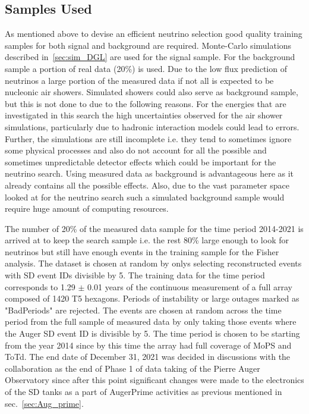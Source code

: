 \subsection{Samples Used}
\label{subsec:nu_sel_samp}
As mentioned above to devise an efficient neutrino selection good quality training samples for both signal and background are required. Monte-Carlo simulations described in~\ref{sec:sim_DGL} are used for the signal sample. For the background sample a portion of real data (20\%) is used. Due to the low flux prediction of neutrinos a large portion of the measured data if not all is expected to be nucleonic air showers. Simulated showers could also serve as background sample, but this is not done to due to the following reasons. For the energies that are investigated in this search the high uncertainties observed for the air shower simulations, particularly due to hadronic interaction models could lead to errors. Further, the simulations are still incomplete i.e. they tend to sometimes ignore some physical processes and also do not account for all the possible and sometimes unpredictable detector effects which could be important for the neutrino search. Using measured data as background is advantageous here as it already contains all the possible effects. Also, due to the vast parameter space looked at for the neutrino search such a simulated background sample would require huge amount of computing resources. 

The number of 20\% of the measured data sample for the time period 2014-2021 is arrived at to keep the search sample i.e. the rest 80\% large enough to look for neutrinos but still have enough events in the training sample for the Fisher analysis. The dataset is chosen at random by onlys selecting reconstructed events with SD event IDs divisible by 5. The training data for the time period corresponds to 1.29 $\pm$ 0.01 years of the continuous measurement of a full array composed of 1420 T5 hexagons. Periods of instability or large outages marked as "BadPeriods" are rejected. The events are chosen at random across the time period from the full sample of measured data by only taking those events where the Auger SD event ID is divisible by 5. The time period is chosen to be starting from the year 2014 since by this time the array had full coverage of MoPS and ToTd. The end date of December 31, 2021 was decided in discussions with the collaboration as the end of Phase 1 of data taking of the Pierre Auger Observatory since after this point significant changes were made to the electronics of the SD tanks as a part of AugerPrime activities as previous mentioned in sec.~\ref{sec:Aug_prime}.

